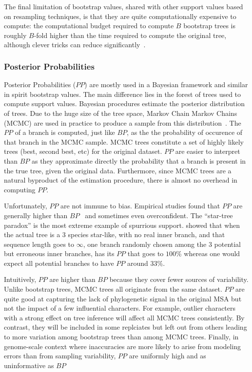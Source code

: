 The final limitation of bootstrap values, shared with other support values based on resampling techniques, is that they are quite computationally expensive to compute: the computational budget required to compute $B$ bootstrap trees is roughly $B$-fold higher than the time required to compute the original tree, although clever tricks can reduce significantly~\citep{Stamatakis2006}.

\subsubsection{Posterior Probabilities} \label{sec:posterior-probabilities}

Posterior Probabilities ($PP$) are mostly used in a Bayesian framework and similar in spirit bootstrap values. The main difference lies in the forest of trees used to compute support values. Bayesian procedures estimate the posterior distribution of trees. Due to the huge size of the tree space, Markov Chain Markov Chains (MCMC) are used in practice to produce a sample from this distribution~\citep{Yang1997a}. The $PP$ of a branch is computed, just like $BP$, as the the probability of occurence of that branch in the MCMC sample. MCMC trees constitute a set of highly likely trees (best, second best, etc) for the original dataset. $PP$ are easier to interpret than $BP$ as they approximate directly the probability that a branch is present in the true tree, given the original data. Furthermore, since MCMC trees are a natural byproduct of the estimation procedure, there is almost no overhead in computing $PP$. 

Unfortunately, $PP$ are not immune to bias. Empirical studies found that $PP$ are generally higher than $BP$~\citep{Anisimova2011} and sometimes even overconfident. The ``star-tree paradox'' \citep{Yang2007} is the most extreme example of spurrious support. \citet{Yang2007} showed that when the actual tree is a 3 species star-like, with no real inner branch, and that sequence length goes to $\infty$, one branch randomly chosen among the 3 potential but erroneous inner branches, has its $PP$ that goes to $100$\% whereas one would expect all potential branches to have $PP$ around $33$\%. 

Intuitively, $PP$ are higher than $BP$ because they cover fewer sources of variability. Unlike bootstrap trees, MCMC trees all originate from the same dataset. $PP$ are quite good at capturing the lack of phylogenetic signal in the original MSA but not the impact of a few influential characters. For example, outlier characters with a strong effect on tree inference will affect all MCMC trees consistently. By contrast, they will be included in some replciates but left out from others leading to more variation among bootstrap trees than among MCMC trees. Finally, in genome-scale context where inaccuracies are more likely to arise from modeling errors than from sampling variability, $PP$ are uniformly high and as uninformative as $BP$~\citep{Philippe2011, Kumar2012}


